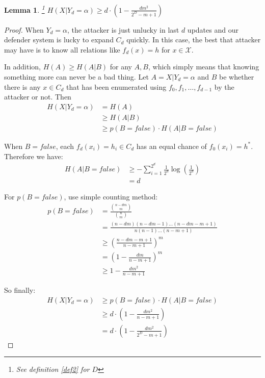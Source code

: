 \documentclass[10pt,a4paper]{article}
\newtheorem{mylemma}{Lemma}
\begin{document}
		\begin{mylemma}\label{lem1}\footnote{See definition \ref{def2} for $D$}
			$H(X|Y_d = \alpha) \geq d \cdot (1-\frac{dm^2}{2^D-m+1})$
		\end{mylemma}
		
		\begin{proof}
			When $Y_d = \alpha$, the attacker
			is just unlucky in last $d$ updates
			and our defender system is lucky
			to expand $C_d$ quickly.
			In this case, the best that attacker
			may have is to know all relations
			like $f_d(x) = h$ for $x \in \mathcal X$.
			
			In addition, $H(A) \geq H(A|B)$ for
			any $A, B$, which simply means that knowing something
			more can never be a bad thing. Let $A = X | Y_d = \alpha$
			and $B$ be whether there is any $x \in C_d$ that
			has been enumerated using $f_0, f_1, \ldots, f_{d-1}$ 
			by the attacker or not.
			Then
			\begin{align*}
				H(X | Y_d = \alpha) &= H(A)\\
					&\geq H(A | B)\\
					&\geq p(B = false) \cdot H(A | B = false)
			\end{align*}
			
			When $B = false$, each $f_d(x_i) = h_i \in C_d$
			has an equal chance of $f_0(x_i) = h^*$. Therefore
			we have:
			\begin{align*}
				H(A | B = false) &\geq -\sum_{i = 1}^{2^d} \frac{1}{2^d} \log(\frac{1}{2^d})\\
					&= d
			\end{align*}
			
			For $p(B = false)$, use simple counting method:
			\begin{align*}
				p(B = false) &= \frac{\binom{n-dm}{m}}{\binom{n}{m}}\\
					&= \frac{(n-dm)(n-dm-1)\ldots(n-dm-m+1)}{n(n-1)\ldots(n-m+1)}\\
					&\geq (\frac{n-dm-m+1}{n-m+1})^m\\
					&= (1-\frac{dm}{n-m+1})^m\\
					&\geq 1-\frac{dm^2}{n-m+1}
			\end{align*}
			
			So finally:
			\begin{align*}
				H(X | Y_d = \alpha) &\geq p(B = false) \cdot H(A | B = false)\\
					&\geq d \cdot (1-\frac{dm^2}{n-m+1})\\
					&= d \cdot (1-\frac{dm^2}{2^D-m+1})
			\end{align*}
		\end{proof}
		
\end{document}
